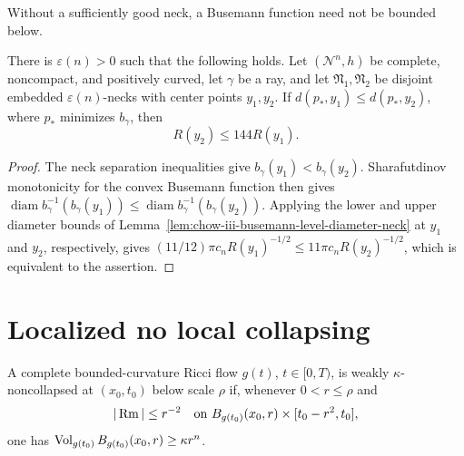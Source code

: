 \begin{remark}
\label{rem:chow-iii-busemann-minimum-neck-essential}
Without a sufficiently good neck, a Busemann function need not be bounded
below.
\end{remark}

\begin{proposition}
\label{prop:chow-iii-farther-necks-larger-radii}
There is \(\varepsilon(n)>0\) such that the following holds.  Let
\((\mathcal N^n,h)\) be complete, noncompact, and positively curved, let
\(\gamma\) be a ray, and let \(\mathfrak N_1,\mathfrak N_2\) be disjoint
embedded \(\varepsilon(n)\)-necks with center points \(y_1,y_2\).  If
\(d(p_*,y_1)\le d(p_*,y_2)\), where \(p_*\) minimizes \(b_\gamma\), then
\[
 R(y_2)\le144R(y_1).
\]
\end{proposition}
\begin{proof}
The neck separation inequalities give \(b_\gamma(y_1)<b_\gamma(y_2)\).
Sharafutdinov monotonicity for the convex Busemann function then gives
\(\operatorname{diam}b_\gamma^{-1}(b_\gamma(y_1))\le
\operatorname{diam}b_\gamma^{-1}(b_\gamma(y_2))\).  Applying the lower and
upper diameter bounds of Lemma~\ref{lem:chow-iii-busemann-level-diameter-neck}
at \(y_1\) and \(y_2\), respectively, gives
\((11/12)\pi c_nR(y_1)^{-1/2}\le11\pi c_nR(y_2)^{-1/2}\), which is equivalent
to the assertion.
\end{proof}

\section{Localized no local collapsing}

\begin{definition}
\label{def:chow-iii-weakly-kappa-noncollapsed}
A complete bounded-curvature Ricci flow \(g(t)\), \(t\in[0,T)\), is weakly
\(\kappa\)-noncollapsed at \((x_0,t_0)\) below scale \(\rho\) if, whenever
\(0<r\le\rho\) and
\[
 |\operatorname{Rm}|\le r^{-2}\quad\text{on }B_{g(t_0)}(x_0,r)\times[t_0-r^2,t_0],
\]
one has \(\operatorname{Vol}_{g(t_0)}B_{g(t_0)}(x_0,r)\ge\kappa r^n\).
\end{definition}

